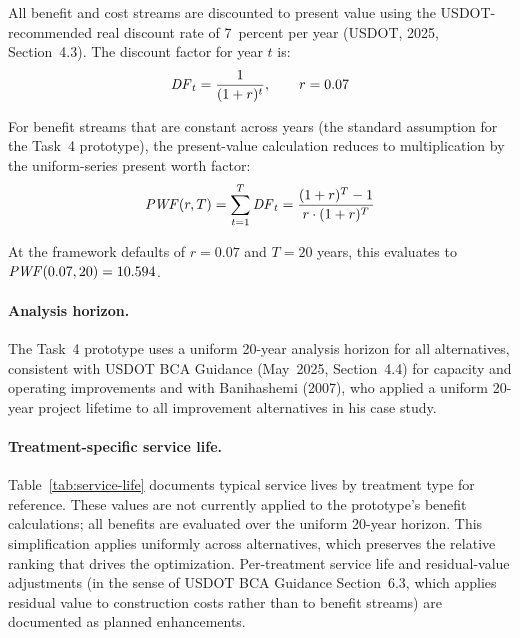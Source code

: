 All benefit and cost streams are discounted to present value using the
USDOT-recommended real discount rate of 7~percent per year (USDOT, 2025,
Section~4.3). The discount factor for year $t$ is:
\begin{equation}
\mathit{DF}_t = \frac{1}{(1 + r)^t}, \qquad r = 0.07
\label{eq:df}
\end{equation}

For benefit streams that are constant across years (the standard assumption for
the Task~4 prototype), the present-value calculation reduces to multiplication
by the uniform-series present worth factor:
\begin{equation}
\mathit{PWF}(r, T) = \sum_{t=1}^{T} \mathit{DF}_t = \frac{(1+r)^T - 1}{r \cdot (1+r)^T}
\label{eq:pwf}
\end{equation}

\noindent At the framework defaults of $r = 0.07$ and $T = 20$ years, this
evaluates to $\mathit{PWF}(0.07, 20) = 10.594$.

\paragraph{Analysis horizon.} The Task~4 prototype uses a uniform 20-year
analysis horizon for all alternatives, consistent with USDOT BCA Guidance
(May~2025, Section~4.4) for capacity and operating improvements and with
Banihashemi (2007), who applied a uniform 20-year project lifetime to all
improvement alternatives in his case study.

\paragraph{Treatment-specific service life.} Table~\ref{tab:service-life}
documents typical service lives by treatment type for reference. These values
are not currently applied to the prototype's benefit calculations; all benefits
are evaluated over the uniform 20-year horizon. This simplification applies
uniformly across alternatives, which preserves the relative ranking that drives
the optimization. Per-treatment service life and residual-value adjustments
(in the sense of USDOT BCA Guidance Section~6.3, which applies residual value
to construction costs rather than to benefit streams) are documented as
planned enhancements.

